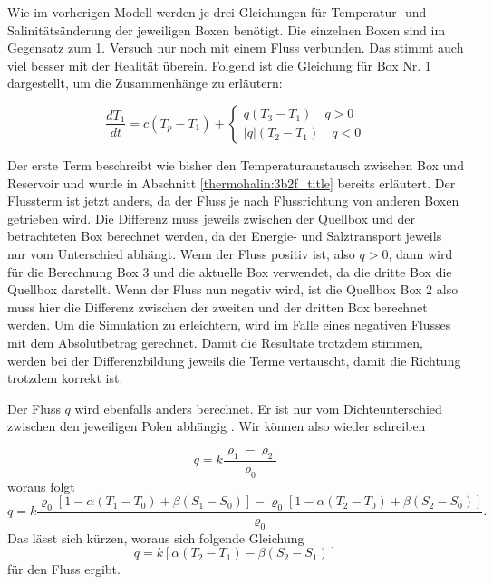 Wie im vorherigen Modell werden je drei Gleichungen für Temperatur- und Salinitätsänderung der jeweiligen Boxen benötigt.
Die einzelnen Boxen sind im Gegensatz zum 1. Versuch nur noch  mit einem Fluss verbunden. Das stimmt auch viel besser mit der Realität überein. Folgend ist die Gleichung für Box Nr. 1 dargestellt, um die Zusammenhänge zu erläutern:

\begin{equation}
\frac{dT_1}{dt} = c(T_p-T_1)+ \begin{cases} q(T_3-T_1)  \quad q>0 \\ |q|(T_2-T_1)  \quad q<0 \end{cases}
\end{equation}

Der erste Term beschreibt wie bisher den Temperaturaustausch zwischen Box und Reservoir und wurde in  Abschnitt \ref{thermohalin:3b2f_title} bereits erläutert. Der Flussterm ist jetzt anders, da der Fluss je nach Flussrichtung von anderen Boxen getrieben wird. Die Differenz muss jeweils zwischen der Quellbox und der betrachteten Box berechnet werden, da der Energie- und Salztransport jeweils nur vom Unterschied abhängt.
Wenn der Fluss positiv ist, also $q>0$, dann wird für die Berechnung Box 3 und die aktuelle Box verwendet, da die dritte Box die Quellbox darstellt. Wenn der Fluss nun negativ wird, ist die Quellbox Box 2 also muss hier die Differenz zwischen der zweiten und der dritten Box berechnet werden. Um die Simulation zu erleichtern, wird im Falle eines negativen Flusses mit dem Absolutbetrag gerechnet. Damit die Resultate trotzdem stimmen, werden bei der Differenzbildung jeweils die Terme vertauscht, damit die Richtung trotzdem korrekt ist. 

Der Fluss $q$ wird ebenfalls anders berechnet. Er ist nur vom Dichteunterschied zwischen den jeweiligen Polen abhängig \cite{skript:kaperengler}.
Wir können also wieder schreiben

\begin{equation}
q = k\frac{\varrho_1-\varrho_2}{\varrho_0}
\end{equation}
woraus folgt
\begin{equation}
q= k\frac{\varrho_0[1-\alpha(T_1-T_0)+\beta(S_1-S_0)]-\varrho_0[1-\alpha(T_2-T_0)+\beta(S_2-S_0)]}{\varrho_0}.
\end{equation}
Das lässt sich kürzen, woraus sich folgende Gleichung
\begin{equation}
q = k[\alpha(T_2-T_1)-\beta(S_2-S_1)] 
\end{equation}
für den Fluss ergibt.


